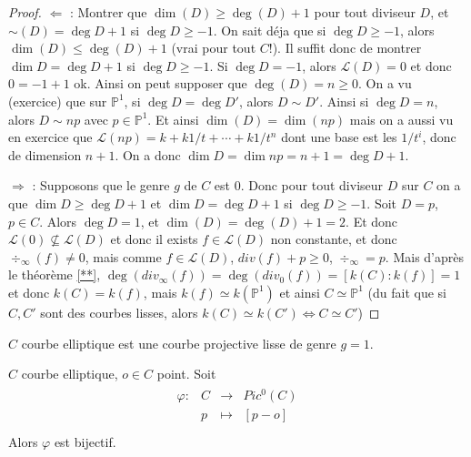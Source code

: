         \begin{proof}
            \item $\Leftarrow$ : Montrer que $\dim(D) \geq \deg(D) + 1$ pour tout diviseur $D$, et $\sim(D) = \deg D + 1$ si $\deg D \geq -1$. On sait déja que si $\deg D \geq -1$, alors $\dim(D) \leq \deg(D) + 1$ (vrai pour tout $C$!). Il suffit donc de montrer $\dim D = \deg D + 1$ si $\deg D \geq -1$. Si $\deg D = -1$, alors $\mathcal{L}(D) = 0$ et donc $0 = -1 + 1$ ok. Ainsi on peut supposer que $\deg(D) = n \geq 0$. On a vu (exercice) que sur $\mathbb{P}^1$, si $\deg D = \deg D'$, alors $D \sim D'$. Ainsi si $\deg D = n$, alors $D \sim np$ avec $p \in \mathbb{P}^1$. Et ainsi $\dim(D) = \dim(np)$ mais on a aussi vu en exercice que $\mathcal{L}(np) = k + k1/t + \cdots + k1/t^n$ dont une base est les $1/t^i$, donc de dimension $n + 1$. On a donc $\dim D = \dim np = n + 1 = \deg D + 1$.
            \item $\Rightarrow$ : Supposons que le genre $g$ de $C$ est $0$. Donc pour tout diviseur $D$ sur $C$ on a que $\dim D \geq \deg D + 1$ et $\dim D = \deg D + 1$ si $\deg D \geq -1$. Soit $D = p$, $p \in C$. Alors $\deg D = 1$, et $\dim(D) = \deg(D) + 1 = 2$. Et donc $\mathcal{L}(0) \nsubseteq \mathcal{L}(D)$ et donc il exists $f \in \mathcal{L}(D)$ non constante, et donc $\div_{\infty}(f) \neq 0$, mais comme $f \in \mathcal{L}(D)$, $div(f) + p \geq 0$, $\div_\infty = p$. Mais d'après le théorème \ref{**}, $\deg(div_\infty(f)) = \deg(div_0(f)) = [k(C): k(f)] = 1$ et donc $k(C) = k(f)$, mais $k(f) \simeq k(\mathbb{P}^1)$ et ainsi $C \simeq \mathbb{P}^1$ (du fait que si $C,C'$ sont des courbes lisses, alors $k(C) \simeq k(C') \iff C \simeq C'$)
        \end{proof}
        \begin{defi}
            $C$ courbe elliptique est une courbe projective lisse de genre $g = 1$.
        \end{defi}
        \begin{theo}
            $C$ courbe elliptique, $o \in C$ point. Soit 
            \begin{align*}
                \begin{array}{cccc}
                    \varphi : & C & \to & Pic^0(C) \\
                    & p & \mapsto & [p - o]\\
                \end{array}
            \end{align*}
            Alors $\varphi$ est bijectif.
        \end{theo}
